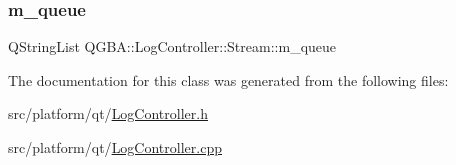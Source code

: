 \mbox{\label{class_q_g_b_a_1_1_log_controller_1_1_stream_a29e088e1e72dccd1ef9ba34f8dc407b3}} 
\subsubsection{\texorpdfstring{m\+\_\+queue}{m\_queue}}
{\footnotesize\ttfamily Q\+String\+List Q\+G\+B\+A\+::\+Log\+Controller\+::\+Stream\+::m\+\_\+queue\hspace{0.3cm}{\ttfamily [private]}}



The documentation for this class was generated from the following files\+:\begin{DoxyCompactItemize}
\item 
src/platform/qt/\mbox{\hyperlink{_log_controller_8h}{Log\+Controller.\+h}}\item 
src/platform/qt/\mbox{\hyperlink{_log_controller_8cpp}{Log\+Controller.\+cpp}}\end{DoxyCompactItemize}

